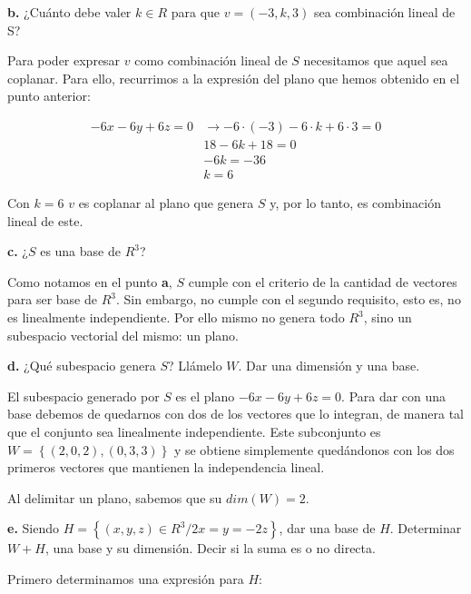 \documentclass[12pt]{article}
\begin{document}
\hspace{6mm}\textbf{b.}
¿Cuánto debe valer \(k \in R\) para que \(v = (-3,k,3)\) sea combinación
lineal de S?

Para poder expresar \(v\) como combinación lineal de \(S\) necesitamos que
aquel sea coplanar. Para ello, recurrimos a la expresión del plano que hemos
obtenido en el punto anterior:

\begin{align*}
  -6x-6y+6z=0 & \rightarrow -6\cdot (-3) - 6\cdot k + 6 \cdot 3 = 0 \\
              & 18 - 6k + 18 = 0                                    \\
              & -6k = -36                                           \\
              & \boxed{k = 6}
\end{align*}

Con \(k = 6\) \(v\) es coplanar al plano que genera \(S\) y, por lo tanto,
es combinación lineal de este.

\hspace{6mm}\textbf{c.}
¿\(S\) es una base de \(R^{3}\)?

Como notamos en el punto \textbf{a},
\(S\) cumple con el criterio de la cantidad de vectores para ser base de
\(R^{3}\).
Sin embargo,
no cumple con el segundo requisito,
esto es,
no es linealmente independiente.
Por ello mismo no genera todo \(R^{3}\),
sino un subespacio vectorial del mismo: un plano.

\hspace{6mm}\textbf{d.}
¿Qué subespacio genera \(S\)? Llámelo \(W\). Dar una dimensión y una base.

El subespacio generado por \(S\) es el plano \(-6x-6y+6z=0\).
Para dar con una base debemos de quedarnos con dos de los vectores que lo
integran, de manera tal que el conjunto sea linealmente independiente.
Este subconjunto es \(W = \left\{(2,0,2),(0,3,3)\right\}\) y se obtiene
simplemente quedándonos con los dos primeros vectores que mantienen la
independencia lineal.

Al delimitar un plano, sabemos que su \(dim(W) = 2\).

\hspace{6mm}\textbf{e.}
Siendo \(H = \left\{(x,y,z) \in R^{3} / 2x = y = -2z\right\}\),
dar una base de \(H\).
Determinar \(W + H\), una base y su dimensión.
Decir si la suma es o no directa.

Primero determinamos una expresión para \(H\):
\end{document}

